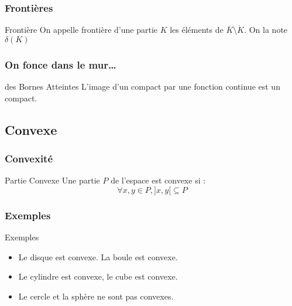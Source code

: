 \documentclass{beamercours}
\begin{document}
\begin{frame}
\frametitle{Frontières}
\vspace{-5pt}
\begin{définition}{Frontière}{}
On appelle frontière d'une partie $K$ les éléments de $\overline{K} \setminus \mathring{K}$. On la note $\delta(K)$
\end{définition}
\end{frame}

\begin{frame}
\frametitle{On fonce dans le mur\dots}
\begin{théorème}{des Bornes Atteintes}{}
L'image d'un compact par une fonction continue est un compact.
\end{théorème}
\end{frame}

\subsection{Convexe}
\begin{frame}
\frametitle{Convexité}
\begin{définition}{Partie Convexe}{}
Une partie $P$ de l'espace est convexe si :
\[
    \forall x, y \in P, ]x, y[ \subseteq P
\]
\end{définition}
\end{frame}

\begin{frame}
    \frametitle{Exemples}
    \begin{propositionfr}{Exemples}{}
        \begin{itemize}[<+->]
            \item Le disque est convexe. La boule est convexe.
            \item Le cylindre est convexe, le cube est convexe.
            \item Le cercle et la sphère ne sont pas convexes.
        \end{itemize}
    \end{propositionfr}
\end{frame}
\end{document}
